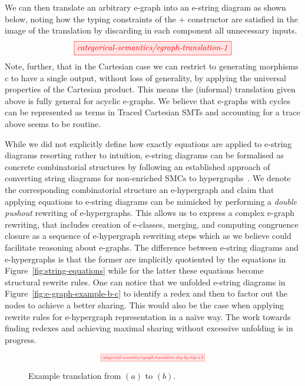 \documentclass[sigconf, 9pt, nonacm]{acmart}
\theoremstyle{definition}
\begin{document}
We can then translate an arbitrary e-graph into an e-string diagram as shown below, noting how the typing constraints of the $+$ constructor are satisfied in the image of the translation by discarding in each component all unnecessary inputs.
\[
    \tikzfig{categorical-semantics/egraph-translation-1}
\]
Note, further, that in the Cartesian case we can restrict to generating morphisms $c$ to have a single output,  without loss of generality,  by applying the universal properties of the Cartesian product.  This means the (informal) translation given above is fully general for acyclic e-graphs.
We believe that e-graphs with cycles can be represented as terms in Traced Cartesian SMTs and accounting for a trace above seems to be routine.


While we did not explicitly define how exactly equations are applied to e-string diagrams resorting rather to intuition, e-string diagrams can be formalised as concrete combinatorial structures by following an established approach of converting string diagrams for non-enriched SMCs to hypergraphs~\cite{bonchi_string_2022,bonchi_string_2022-1,bonchi_string_2022-2}.
We denote the corresponding combinatorial structure an e-hypergraph and claim that applying equations to e-string diagrams can be mimicked by performing a \textit{double pushout} rewriting of e-hypergraphs.
This allows us to express a complex e-graph rewriting, that includes creation of e-classes, merging, and computing congruence closure as a sequence of e-hypergraph rewriting steps which as we believe could facilitate reasoning about e-graphs.
The difference between e-string diagrams and e-hypergraphs is that the former are implicitly quotiented by the equations in Figure~\ref{fig:string-equations} while for the latter these equations become structural rewrite rules.
One can notice that we unfolded e-string diagrams in Figure~\ref{fig:e-graph-example-b-c} to identify a redex and then to factor out the nodes to achieve a better sharing.
This would also be the case when applying rewrite rules for e-hypergraph representation in a na\"ive way.
The work towards finding redexes and achieving maximal sharing without excessive unfolding is in progress.

\begin{figure*}
    \[
        \scalebox{0.5}{
        \tikzfig{categorical-semantics/egraph-translation-step-by-step-a-b}
        }
    \]
    \caption{Example translation from $(a)$ to $(b)$.}
    \label{fig:e-graph-example-a-b}
\end{figure*}
\end{document}
